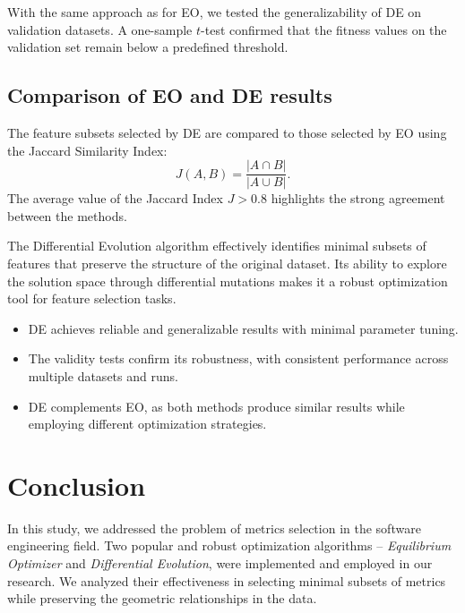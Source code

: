 \documentclass{styles/svproc}
\begin{document}
With the same approach as for EO, we tested the generalizability of DE on validation datasets. A one-sample \( t \)-test confirmed that the fitness values on the validation set remain below a predefined threshold.

\subsection{Comparison of EO and DE results}

The feature subsets selected by DE are compared to those selected by EO using the Jaccard Similarity Index:
\[
J(A, B) = \frac{|A \cap B|}{|A \cup B|}.
\]
The average value of the Jaccard Index \( J > 0.8 \) highlights the strong agreement between the methods.

The Differential Evolution algorithm effectively identifies minimal subsets of features that preserve the structure of the original dataset. Its ability to explore the solution space through differential mutations makes it a robust optimization tool for feature selection tasks.

\begin{itemize}
    \item DE achieves reliable and generalizable results with minimal parameter tuning.
    \item The validity tests confirm its robustness, with consistent performance across multiple datasets and runs.
    \item DE complements EO, as both methods produce similar results while employing different optimization strategies.
\end{itemize}

\section{Conclusion}
\label{S:Conclusion}

In this study, we addressed the problem of metrics selection in the software engineering field. Two popular and robust optimization algorithms -- \textit{Equilibrium Optimizer} and \textit{Differential Evolution}, were implemented and employed in our research. We analyzed their effectiveness in selecting minimal subsets of metrics while preserving the geometric relationships in the data.
\end{document}
